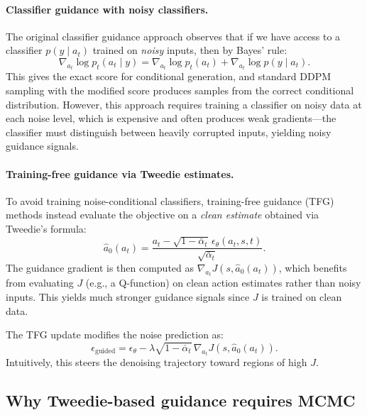 \documentclass{article}
\theoremstyle{plain}
\theoremstyle{definition}
\theoremstyle{remark}
\begin{document}
\paragraph{Classifier guidance with noisy classifiers.}
The original classifier guidance approach \citep{dhariwal2021beatgans} observes that if we have access to a classifier $p(y \mid a_t)$ trained on \emph{noisy} inputs, then by Bayes' rule:
\begin{equation}
  \nabla_{a_t} \log p_t(a_t \mid y) = \nabla_{a_t} \log p_t(a_t) + \nabla_{a_t} \log p(y \mid a_t).
  \label{eq:classifier-guidance}
\end{equation}
This gives the exact score for conditional generation, and standard DDPM sampling with the modified score produces samples from the correct conditional distribution.
However, this approach requires training a classifier on noisy data at each noise level, which is expensive and often produces weak gradients---the classifier must distinguish between heavily corrupted inputs, yielding noisy guidance signals.

\paragraph{Training-free guidance via Tweedie estimates.}
To avoid training noise-conditional classifiers, training-free guidance (TFG) methods \citep{ye2024tfg,bansal2023universal} instead evaluate the objective on a \emph{clean estimate} obtained via Tweedie's formula:
\begin{equation}
  \hat{a}_0(a_t) = \frac{a_t - \sqrt{1-\bar{\alpha}_t}\, \epsilon_\theta(a_t, s, t)}{\sqrt{\bar{\alpha}_t}}.
  \label{eq:tweedie}
\end{equation}
The guidance gradient is then computed as $\nabla_{a_t} J(s, \hat{a}_0(a_t))$, which benefits from evaluating $J$ (e.g., a Q-function) on clean action estimates rather than noisy inputs.
This yields much stronger guidance signals since $J$ is trained on clean data.

The TFG update modifies the noise prediction as:
\begin{equation}
  \epsilon_{\text{guided}} = \epsilon_\theta - \lambda \sqrt{1-\bar{\alpha}_t}\, \nabla_{a_t} J(s, \hat{a}_0(a_t)).
  \label{eq:tfg-update}
\end{equation}
Intuitively, this steers the denoising trajectory toward regions of high $J$.

\subsection{Why Tweedie-based guidance requires MCMC}
\label{sec:why-mcmc}
\end{document}
